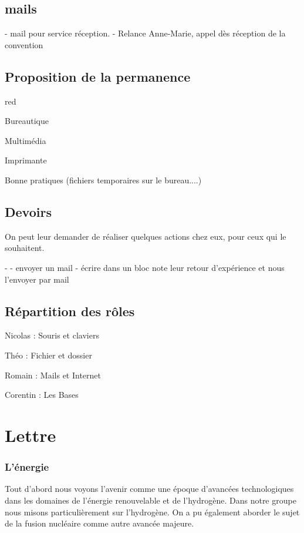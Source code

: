 \section{mails}

- mail pour service réception.
- Relance Anne-Marie, appel dès réception de la convention


\section{Proposition de la permanence}

\begin{items}{red}{\Circle}
\item Bureautique
\item Multimédia
\item Imprimante
\item Bonne pratiques (fichiers temporaires sur le bureau....)
\end{items}



\section{Devoirs}

On peut leur demander de réaliser quelques actions chez eux, pour ceux qui le souhaitent.

- 
- envoyer un mail
- écrire dans un bloc note leur retour d'expérience et nous l'envoyer par mail



\section{Répartition des rôles}

Nicolas : Souris et claviers

Théo : Fichier et dossier

Romain : Mails et Internet

Corentin : Les Bases


\chapter{Lettre}

\subsection{L'énergie}

Tout d'abord nous voyons l'avenir comme une époque d'avancées technologiques dans les domaines de l'énergie renouvelable et de l'hydrogène. Dans notre groupe nous misons particulièrement sur l'hydrogène. On a pu également aborder le sujet de la fusion nucléaire comme autre avancée majeure.\\

